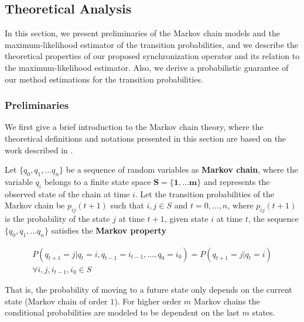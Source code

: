 \subsection{Theoretical Analysis}
\label{sec:theoretical}

 In this section, we present preliminaries of the Markov chain models and the maximum-likelihood estimator of the transition probabilities, and we describe the theoretical properties of our proposed synchronization operator and its relation to the maximum-likelihood estimator. Also, we derive a probabilistic guarantee of our method estimations for the transition probabilities. 
 
 
 \subsubsection*{Preliminaries}
 We first give a brief introduction to the Markov chain theory, where the theoretical definitions and notations presented in this section are based  on the work described in \cite{bertsekas2002introduction,Billingsley1961,anderson1957statistical,howard2012dynamic}.

\begin{definition}
	Let $\{q_0, q_1, \ldots q_n\}$ be a sequence of random variables as \textbf{Markov chain}, where the variable $q_i$ belongs to a finite state space $\mathbf{S =\{1,\ldots m\}}$ and represents the observed state of the chain at time $i$. Let the transition probabilities of the Markov chain be $p_{ij}(t+1)$ such that $i,j \in S$ and $t=0,\ldots, n$, where  $p_{ij}(t+1)$ is the probability of the state $j$ at time $t+1$, given  state $i$ at time $t$, the sequence $\{q_0, q_1, \ldots q_n\}$ satisfies the \textbf{Markov property} 
	
	\begin{equation}
	\begin{aligned}
	P(q_{t+1}=j|q_{t}=i,q_{t-1}=i_{t-1},\ldots ,q_{0}=i_{0})=P(q_{t+1}=j|q_{t}=i)\\
	\forall i,j,i_{t-1},i_{0} \in S
	\end{aligned}
	\end{equation}

\end{definition}



\par That is, the probability of moving to a future state only depends on the current state (Markov chain of order $1$). For higher order $m$ Markov chains the conditional probabilities are modeled to be dependent on the last $m$ states. 

